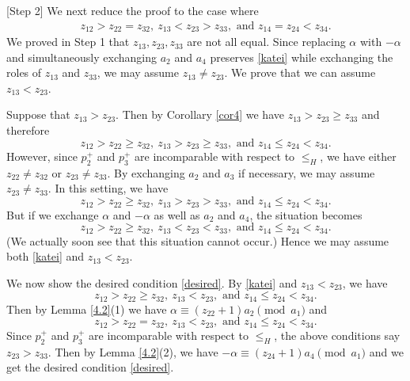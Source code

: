 \documentclass[12pt]{amsart}
\numberwithin{equation}{section}
\theoremstyle{definition}
\begin{document}
[Step 2] 
We next reduce the proof to the case where
\begin{align}
    \label{desired}
z_{12}>z_{22}= z_{32},\
z_{13}<z_{23}>z_{33}, \text{ and }
z_{14}= z_{24}< z_{34}.
\end{align}
We proved in Step 1 that $z_{13},z_{23},z_{33}$ are not all equal.
Since replacing $\alpha$ with $-\alpha$ and simultaneously
exchanging $a_2$ and $a_4$ preserves \eqref{katei} while exchanging
the roles of $z_{13}$ and $z_{33}$, we may assume
$z_{13}\ne z_{23}$.
We prove that we can assume $z_{13}<z_{23}$.

Suppose that $z_{13}>z_{23}$. Then by Corollary \ref{cor4}
we have $z_{13}>z_{23} \geq z_{33}$
and therefore
\[
z_{12}>z_{22}\geq z_{32},\
z_{13}>z_{23}\geq z_{33}, \text{ and }
z_{14}\leq z_{24}< z_{34}.
\]
However, since $p^+_2$ and $p^+_3$ are incomparable with respect to $\leq_H$,
we have either $z_{22}\ne z_{32}$ or $z_{23} \ne z_{33}$.
By exchanging $a_2$ and $a_3$ if necessary,
we may assume $z_{23}\ne z_{33}$.
In this setting, we have
\[
z_{12}>z_{22}\geq z_{32},\
z_{13}>z_{23}> z_{33}, \text{ and }
z_{14}\leq z_{24}< z_{34}.
\]
But if we exchange $\alpha$ and $-\alpha$ as well as $a_2$ and $a_4$,
the situation becomes
\[
z_{12}>z_{22}\geq z_{32},\
z_{13}<z_{23}< z_{33}, \text{ and }
z_{14}\leq z_{24}< z_{34}.
\]
(We actually soon see that this situation cannot occur.)
Hence we may assume both \eqref{katei} and
$z_{13}<z_{23}$.

We now show the desired condition \eqref{desired}.
By \eqref{katei} and
$z_{13}<z_{23}$, we have
\[
z_{12}>z_{22}\geq z_{32},\
z_{13}<z_{23}, \text{ and }
z_{14}\leq z_{24}< z_{34}.
\]
Then by Lemma \ref{4.2}(1)
we have $\alpha \equiv (z_{22}+1)a_2 \pmod{a_1}$
and
\[
z_{12}>z_{22}= z_{32},\
z_{13}<z_{23}, \text{ and }
z_{14}\leq z_{24}< z_{34}.
\]
Since $p_2^+$ and $p_3^+$ are incomparable with respect to $\leq_H$,
the above conditions say $z_{23}>z_{33}$.
Then by Lemma \ref{4.2}(2),
we have $-\alpha \equiv (z_{24}+1)a_4 \pmod {a_1}$
and we get the desired condition \eqref{desired}.
\end{document}
